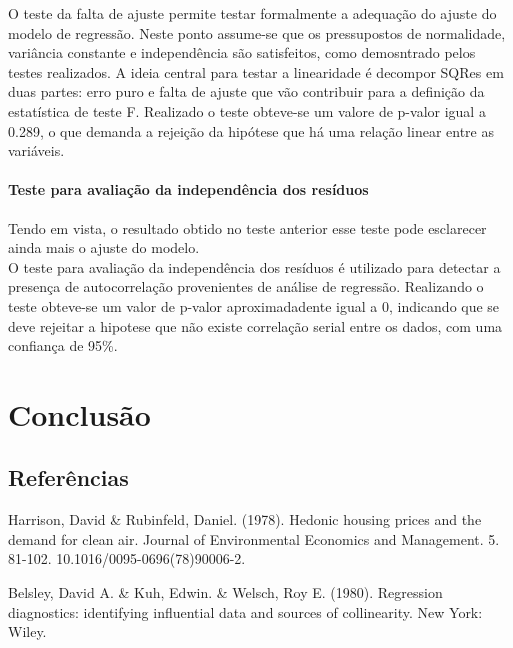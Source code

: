 \documentclass[
  letterpaper,
]{report}
\let\oldparagraph\paragraph
\renewcommand{\paragraph}[1]{\oldparagraph{#1}\mbox{}}
\begin{document}
O teste da falta de ajuste permite testar formalmente a adequação do
ajuste do modelo de regressão. Neste ponto assume-se que os pressupostos
de normalidade, variância constante e independência são satisfeitos,
como demosntrado pelos testes realizados. A ideia central para testar a
linearidade é decompor SQRes em duas partes: erro puro e falta de ajuste
que vão contribuir para a definição da estatística de teste F. Realizado
o teste obteve-se um valore de p-valor igual a 0.289, o que demanda a
rejeição da hipótese que há uma relação linear entre as variáveis.

\hypertarget{teste-para-avaliauxe7uxe3o-da-independuxeancia-dos-resuxedduos}{%
\paragraph{Teste para avaliação da independência dos
resíduos}\label{teste-para-avaliauxe7uxe3o-da-independuxeancia-dos-resuxedduos}}

Tendo em vista, o resultado obtido no teste anterior esse teste pode
esclarecer ainda mais o ajuste do modelo.\\
O teste para avaliação da independência dos resíduos é utilizado para
detectar a presença de autocorrelação provenientes de análise de
regressão. Realizando o teste obteve-se um valor de p-valor
aproximadadente igual a 0, indicando que se deve rejeitar a hipotese que
não existe correlação serial entre os dados, com uma confiança de 95\%.

\hypertarget{conclusuxe3o}{%
\section{Conclusão}\label{conclusuxe3o}}

\hypertarget{referuxeancias}{%
\subsection{Referências}\label{referuxeancias}}

Harrison, David \& Rubinfeld, Daniel. (1978). Hedonic housing prices and
the demand for clean air. Journal of Environmental Economics and
Management. 5. 81-102. 10.1016/0095-0696(78)90006-2.

Belsley, David A. \& Kuh, Edwin. \& Welsch, Roy E. (1980). Regression
diagnostics: identifying influential data and sources of collinearity.
New York: Wiley.
\end{document}
